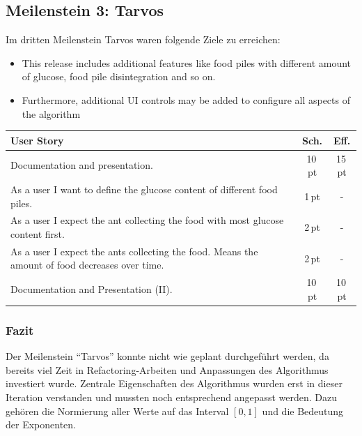 \subsection{Meilenstein 3: Tarvos}

Im dritten Meilenstein Tarvos waren folgende Ziele zu erreichen:

\begin{itemize}[noitemsep]
\item This release includes additional features like food piles with different
amount of glucose, food pile disintegration and so on.
\item Furthermore, additional UI controls may be added to configure all aspects
of the algorithm
\end{itemize}

\begin{table}[H]
\small\sffamily\renewcommand{\arraystretch}{1.5}
\begin{tabular}{| p{12cm} | c | c |}
  \hline
  \bfseries{User Story} & \bfseries{Sch.} & \bfseries{Eff.}  \\
  \hline
  Documentation and presentation. & 10\,pt & 15\,pt \\
  \hline
  As a user I want to define the glucose content of different food piles. &
  1\,pt & - \\
  \hline
  As a user I expect the ant collecting the food with most glucose content first. & 2\,pt & - \\
  \hline
  As a user I expect the ants collecting the food. Means the amount of food decreases over time. & 2\,pt & - \\
  \hline
  Documentation and Presentation (II). & 10\,pt & 10\,pt \\
  \hline
\end{tabular}
\end{table}

\subsubsection*{Fazit}

Der Meilenstein ``Tarvos'' konnte nicht wie geplant durchgeführt werden, da 
bereits viel Zeit in Refactoring-Arbeiten und Anpassungen des Algorithmus 
investiert wurde. Zentrale Eigenschaften des Algorithmus wurden erst in dieser
Iteration verstanden und mussten noch entsprechend angepasst werden. Dazu 
gehören die Normierung aller Werte auf das Interval $[0,1]$ und die Bedeutung
der Exponenten.



